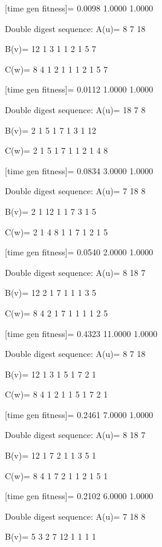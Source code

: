 [time gen fitness]=
    0.0098    1.0000    1.0000

Double digest sequence:
A(u)=
     8     7    18

B(v)=
    12     1     3     1     1     2     1     5     7

C(w)=
     8     4     1     2     1     1     1     2     1     5     7

[time gen fitness]=
    0.0112    1.0000    1.0000

Double digest sequence:
A(u)=
    18     7     8

B(v)=
     2     1     5     1     7     1     3     1    12

C(w)=
     2     1     5     1     7     1     1     2     1     4     8

[time gen fitness]=
    0.0834    3.0000    1.0000

Double digest sequence:
A(u)=
     7    18     8

B(v)=
     2     1    12     1     1     7     3     1     5

C(w)=
     2     1     4     8     1     1     7     1     2     1     5

[time gen fitness]=
    0.0540    2.0000    1.0000

Double digest sequence:
A(u)=
     8    18     7

B(v)=
    12     2     1     7     1     1     1     3     5

C(w)=
     8     4     2     1     7     1     1     1     1     2     5

[time gen fitness]=
    0.4323   11.0000    1.0000

Double digest sequence:
A(u)=
     8     7    18

B(v)=
    12     1     3     1     5     1     7     2     1

C(w)=
     8     4     1     2     1     1     5     1     7     2     1

[time gen fitness]=
    0.2461    7.0000    1.0000

Double digest sequence:
A(u)=
     8    18     7

B(v)=
    12     1     7     2     1     1     3     5     1

C(w)=
     8     4     1     7     2     1     1     2     1     5     1

[time gen fitness]=
    0.2102    6.0000    1.0000

Double digest sequence:
A(u)=
     7    18     8

B(v)=
     5     3     2     7    12     1     1     1     1


